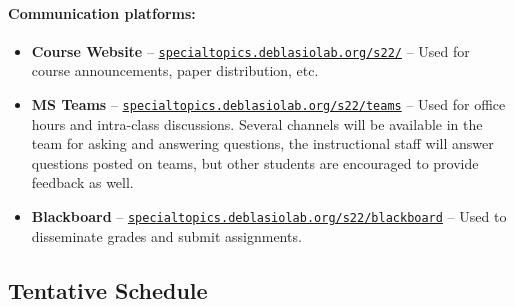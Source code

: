 \documentclass[12pt]{scrartcl}
\begin{document}
\paragraph{Communication platforms:}
\begin{itemize}
\item \textbf{Course Website} -- \href{https://specialtopics.deblasiolab.org/s21/}{\texttt{specialtopics.deblasiolab.org/s22/}} -- Used for course announcements, paper distribution, etc. 
\item \textbf{MS Teams} -- \href{https://specialtopics.deblasiolab.org/s21/teams}{\texttt{specialtopics.deblasiolab.org/s22/teams}}  -- Used for office hours and intra-class discussions. Several channels will be available in the team for asking and answering questions, the instructional staff will answer questions posted on teams, but other students are encouraged to provide feedback as well. 
\item \textbf{Blackboard} -- \href{https://specialtopics.deblasiolab.org/s21/blackboard}{\texttt{specialtopics.deblasiolab.org/s22/blackboard}} -- Used to disseminate grades and submit assignments.
\end{itemize}
 
\clearpage
 
\subsection{Tentative Schedule}
\end{document}

